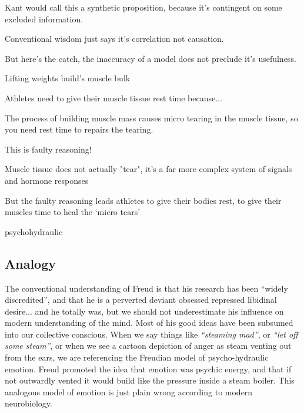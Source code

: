 Kant would call this a synthetic proposition, because it's contingent on some excluded information.

Conventional wisdom just says it's correlation not causation.

But here's the catch, the inaccuracy of a model does not preclude it's usefulness. 


Lifting weights build's muscle bulk

Athletes need to give their muscle tissue rest time because...

The process of building muscle mass causes micro tearing in the muscle tissue, so you need rest time to repairs the tearing.

This is faulty reasoning!

Muscle tissue does not actually "tear", it's a far more complex system of signals and hormone responses

But the faulty reasoning leads athletes to give their bodies rest, to give their muscles time to heal the `micro tears'



psychohydraulic

\subsection{Analogy}

The conventional understanding of Freud is that his research has been ``widely discredited'', and that he is a perverted deviant obsessed repressed libidinal desire... and he totally was, but we should not underestimate his influence on modern understanding of the mind. Most of his good ideas have been subsumed into our collective conscious. When we say things like \textit{``steaming mad''}, or \textit{``let off some steam''}, or when we see a cartoon depiction of anger as steam venting out from the ears, we are referencing the Freudian model of psycho-hydraulic emotion. Freud promoted the idea that emotion was psychic energy, and that if not outwardly vented it would build like the pressure inside a steam boiler. This analogous model of emotion is just plain wrong according to modern neurobiology. 

